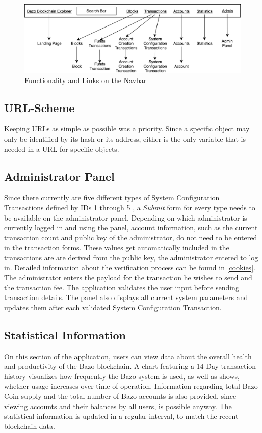 \begin{figure}
  \includegraphics[scale=0.35]{navbarmockup.png}
  \centering
  \caption{Functionality and Links on the Navbar}
  \label{fig:navbar}
\end{figure}

\subsection{URL-Scheme}
Keeping URLs as simple as possible was a priority. Since a specific object may only be identified by its hash or its address, either is the only variable that is needed in a URL for specific objects.

\subsection{Administrator Panel}
Since there currently are five different types of System Configuration Transactions defined by IDs 1 through 5 \cite{bazo}, a \emph{Submit} form for every type needs to be available on the administrator panel. Depending on which administrator is currently logged in and using the panel, account information, such as the current transaction count and public key of the administrator, do not need to be entered in the transaction forms. These values get automatically included in the transactions are are derived from the public key, the administrator entered to log in. Detailed information about the verification process can be found in \ref{cookies}. The administrator enters the payload for the transaction he wishes to send and the transaction fee. The application validates the user input before sending transaction details. The panel also displays all current system parameters and updates them after each validated System Configuration Transaction. 

\subsection{Statistical Information}
On this section of the application, users can view data about the overall health and productivity of the Bazo blockchain. A chart featuring a 14-Day transaction history visualizes how frequently the Bazo system is used, as well as shows, whether usage increases over time of operation. Information regarding total Bazo Coin supply and the total number of Bazo accounts is also provided, since viewing accounts and their balances by all users, is possible anyway. The statistical information is updated in a regular interval, to match the recent blockchain data.

